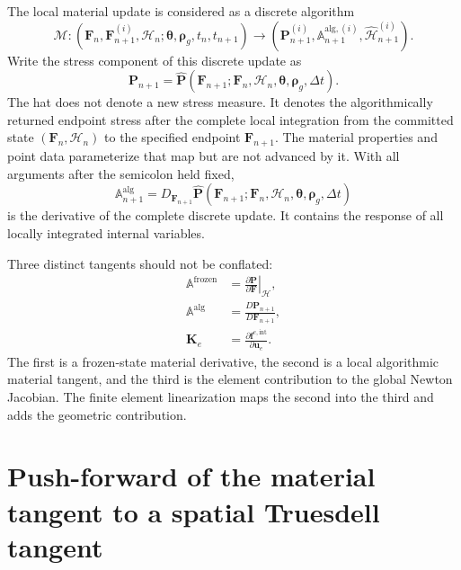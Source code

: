 \documentclass[11pt,a4paper]{article}
\newcommand{\bs}[1]{\boldsymbol{#1}}
\newcommand{\F}{\bs{F}}
\newcommand{\Pstress}{\bs{P}}
\newcommand{\Aalg}{\mathbb{A}^{\mathrm{alg}}}
\newcommand{\vct}[1]{\mathbf{#1}}
\begin{document}
The local material update is considered as a discrete algorithm
\begin{equation}
\mathcal{M}:
\left(
\F_n,\F_{n+1}^{(i)},\mathcal H_n;
\boldsymbol\theta,\boldsymbol\rho_g,t_n,t_{n+1}
\right)
\longrightarrow
\left(
\Pstress_{n+1}^{(i)},
\mathbb A_{n+1}^{\mathrm{alg},(i)},
\widehat{\mathcal H}_{n+1}^{(i)}
\right).
\label{eq:material-map}
\end{equation}
Write the stress component of this discrete update as
\begin{equation}
\Pstress_{n+1}
=
\widehat{\Pstress}
\left(
\F_{n+1};\F_n,\mathcal H_n,
\boldsymbol\theta,\boldsymbol\rho_g,\Delta t
\right).
\label{eq:Phat-map}
\end{equation}
The hat does not denote a new stress measure. It denotes the algorithmically returned endpoint stress after the complete local integration from the committed state $(\F_n,\mathcal H_n)$ to the specified endpoint $\F_{n+1}$. The material properties and point data parameterize that map but are not advanced by it. With all arguments after the semicolon held fixed,
\begin{equation}
\boxed{
\Aalg_{n+1}
=
D_{\F_{n+1}}
\widehat{\Pstress}
\left(
\F_{n+1};\F_n,\mathcal H_n,
\boldsymbol\theta,\boldsymbol\rho_g,\Delta t
\right)
}
\label{eq:Aalg-def}
\end{equation}
is the derivative of the complete discrete update. It contains the response of all locally integrated internal variables.

Three distinct tangents should not be conflated:
\begin{align}
\mathbb{A}^{\mathrm{frozen}}
&=
\left.
\frac{\partial\Pstress}{\partial\F}
\right|_{\mathcal H},
\label{eq:frozen-tangent}
\\
\Aalg
&=
\frac{D\Pstress_{n+1}}{D\F_{n+1}},
\label{eq:alg-tangent-repeated}
\\
\vct{K}_e
&=
\frac{\partial\vct f^{e,\mathrm{int}}}
{\partial\vct{u}_e}.
\label{eq:element-tangent-hierarchy}
\end{align}
The first is a frozen-state material derivative, the second is a local algorithmic material tangent, and the third is the element contribution to the global Newton Jacobian. The finite element linearization maps the second into the third and adds the geometric contribution.

\section{Push-forward of the material tangent to a spatial Truesdell tangent}
\label{sec:pushforward}
\end{document}
